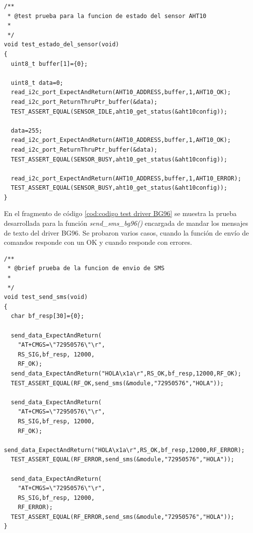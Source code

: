 \begin{lstlisting}[label=cod:codigo test driver AHT10,caption=Tests del driver del sensor AHT10.]
/**
 * @test prueba para la funcion de estado del sensor AHT10
 * 
 */
void test_estado_del_sensor(void)
{
  uint8_t buffer[1]={0};
   
  uint8_t data=0;
  read_i2c_port_ExpectAndReturn(AHT10_ADDRESS,buffer,1,AHT10_OK);
  read_i2c_port_ReturnThruPtr_buffer(&data);
  TEST_ASSERT_EQUAL(SENSOR_IDLE,aht10_get_status(&aht10config));
  
  data=255;
  read_i2c_port_ExpectAndReturn(AHT10_ADDRESS,buffer,1,AHT10_OK);
  read_i2c_port_ReturnThruPtr_buffer(&data);
  TEST_ASSERT_EQUAL(SENSOR_BUSY,aht10_get_status(&aht10config));

  read_i2c_port_ExpectAndReturn(AHT10_ADDRESS,buffer,1,AHT10_ERROR);
  TEST_ASSERT_EQUAL(SENSOR_BUSY,aht10_get_status(&aht10config));
}
\end{lstlisting}
En el fragmento de código \ref{cod:codigo test driver BG96} se muestra la prueba desarrollada para la función \emph{send\_sms\_bg96()} encargada de mandar los mensajes de texto del driver BG96. Se probaron varios casos, cuando la función de envío de comandos responde con un OK y cuando responde con errores.
\begin{lstlisting}[label=cod:codigo test driver BG96,caption=Tests del driver del módulo BG96.]  
/**
 * @brief prueba de la funcion de envio de SMS
 * 
 */
void test_send_sms(void)
{
  char bf_resp[30]={0};
   
  send_data_ExpectAndReturn(
    "AT+CMGS=\"72950576\"\r", 
    RS_SIG,bf_resp, 12000, 
    RF_OK);
  send_data_ExpectAndReturn("HOLA\x1a\r",RS_OK,bf_resp,12000,RF_OK);
  TEST_ASSERT_EQUAL(RF_OK,send_sms(&module,"72950576","HOLA"));
  
  send_data_ExpectAndReturn(
    "AT+CMGS=\"72950576\"\r", 
    RS_SIG,bf_resp, 12000,
    RF_OK);
  send_data_ExpectAndReturn("HOLA\x1a\r",RS_OK,bf_resp,12000,RF_ERROR);
  TEST_ASSERT_EQUAL(RF_ERROR,send_sms(&module,"72950576","HOLA"));

  send_data_ExpectAndReturn(
    "AT+CMGS=\"72950576\"\r",
    RS_SIG,bf_resp, 12000, 
    RF_ERROR);
  TEST_ASSERT_EQUAL(RF_ERROR,send_sms(&module,"72950576","HOLA"));
}
\end{lstlisting}

